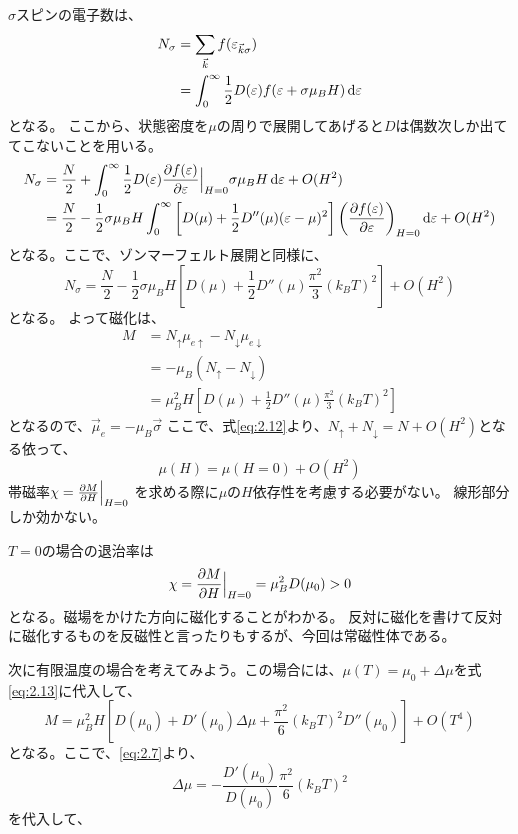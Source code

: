 \documentclass[titlepage]{ltjsarticle}
\begin{document}
\(\sigma\)スピンの電子数は、
\begin{align}
  N_{\sigma}& = \sum_{\vec{k}} f(\varepsilon_{\vec{k}\sigma}) \\
  & = \int_{0}^{\infty}\frac{1}{2}D(\varepsilon)f(\varepsilon + \sigma \mu_B H) \odif{\varepsilon}
\end{align}
となる。
ここから、状態密度を\(\mu\)の周りで展開してあげると\(D\)は偶数次しか出ててこないことを用いる。
\begin{align}
  N_{\sigma} & = \frac{N}{2} + \int_{0}^{\infty}\frac{1}{2}D(\varepsilon) \pdv{f(\varepsilon)}{\varepsilon}\Big|_{H=0} \sigma \mu_B H \odif{\varepsilon} + O(H^2)\\
  & = \frac{N}{2}  -  \frac{1}{2}\sigma \mu_B H \int_{0}^{\infty}\left[ D(\mu) + \frac{1}{2}D''(\mu)(\varepsilon-\mu)^2 \right]\left( \pdv{f(\varepsilon)}{\varepsilon} \right)_{H=0} \odif{\varepsilon} + O(H^2)\\
\end{align}
となる。ここで、ゾンマーフェルト展開と同様に、
\begin{equation}\label{eq:2.12}
  N_\sigma = \frac{N}{2} - \frac{1}{2}\sigma \mu_B H \left[ D(\mu) + \frac{1}{2}D''(\mu)\frac{\pi^2}{3}(k_BT)^2 \right] + O(H^2)
\end{equation}
となる。
よって磁化は、
\begin{align}\label{eq:2.13}
  M & = N_{\uparrow}\mu_{e \uparrow} - N_{\downarrow}\mu_{e \downarrow} \\
  & = -\mu_B \left( N_{\uparrow} - N_{\downarrow}\right) \\
  & = \mu_B^2 H \left[ D(\mu) + \frac{1}{2}D''(\mu) \frac{\pi^2}{3}(k_B T)^2 \right]
\end{align}
となるので、\(\vec{\mu}_e = - \mu_B \vec{\sigma}\)
ここで、式\eqref{eq:2.12}より、\(N_{\uparrow}+N_{\downarrow}=N+O(H^2)\)となる依って、
\begin{equation}
  \mu(H) = \mu(H=0) + O(H^2)
\end{equation}
帯磁率\(\chi = \pdv{M}{H}\Big|_{H=0}\) を求める際に\(\mu\)の\(H\)依存性を考慮する必要がない。
線形部分しか効かない。

\(T=0\)の場合の退治率は
\begin{equation}
  \chi = \pdv{M}{H} \Big|_{H=0} = \mu_B^2 D(\mu_0) >0
\end{equation}
となる。磁場をかけた方向に磁化することがわかる。
反対に磁化を書けて反対に磁化するものを反磁性と言ったりもするが、今回は常磁性体である。

次に有限温度の場合を考えてみよう。この場合には、\(\mu(T) = \mu_0 + \varDelta \mu\)を式\eqref{eq:2.13}に代入して、
\begin{equation}
  M = \mu_B^2 H \left[ D(\mu_0) +D'(\mu_0) \varDelta \mu + \frac{\pi^2}{6}(k_BT)^2 D''(\mu_0) \right] + O(T^4)
\end{equation}
となる。ここで、\eqref{eq:2.7}より、
\begin{equation}
  \varDelta \mu = - \frac{D'(\mu_0)}{D(\mu_0)}\frac{\pi^2}{6}(k_BT)^2 
\end{equation}
を代入して、
\end{document}
